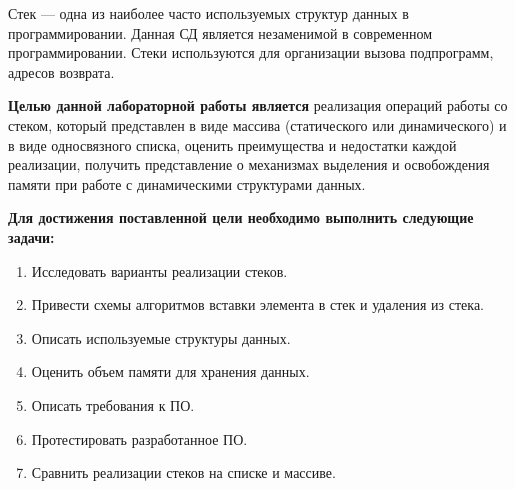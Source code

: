 \Introduction

Стек --- одна из наиболее часто используемых структур данных в программировании. Данная СД является незаменимой в современном программировании. Стеки используются для организации вызова подпрограмм, адресов возврата.

\textbf{Целью данной лабораторной работы является} реализация операций работы со стеком, который представлен в  виде массива (статического или динамического) и в виде односвязного списка, оценить преимущества и недостатки каждой реализации, получить представление о механизмах  выделения  и  освобождения  памяти  при работе  с  динамическими структурами данных.

\textbf{Для достижения поставленной цели необходимо выполнить следующие задачи:}

\begin{enumerate}
	\item Исследовать варианты реализации стеков.
	\item Привести схемы алгоритмов вставки элемента в стек и удаления из стека.
	\item Описать используемые структуры данных.
	\item Оценить объем памяти для хранения данных.
	\item Описать требования к ПО.
	\item Протестировать разработанное ПО.
	\item Сравнить реализации стеков на списке и массиве.
\end{enumerate}